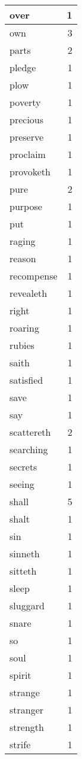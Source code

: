 \begin{center}
\begin{longtable}{l|r}
over & 1\\ \hline 
own & 3\\ \hline 
parts & 2\\ \hline 
pledge & 1\\ \hline 
plow & 1\\ \hline 
poverty & 1\\ \hline 
precious & 1\\ \hline 
preserve & 1\\ \hline 
proclaim & 1\\ \hline 
provoketh & 1\\ \hline 
pure & 2\\ \hline 
purpose & 1\\ \hline 
put & 1\\ \hline 
raging & 1\\ \hline 
reason & 1\\ \hline 
recompense & 1\\ \hline 
revealeth & 1\\ \hline 
right & 1\\ \hline 
roaring & 1\\ \hline 
rubies & 1\\ \hline 
saith & 1\\ \hline 
satisfied & 1\\ \hline 
save & 1\\ \hline 
say & 1\\ \hline 
scattereth & 2\\ \hline 
searching & 1\\ \hline 
secrets & 1\\ \hline 
seeing & 1\\ \hline 
shall & 5\\ \hline 
shalt & 1\\ \hline 
sin & 1\\ \hline 
sinneth & 1\\ \hline 
sitteth & 1\\ \hline 
sleep & 1\\ \hline 
sluggard & 1\\ \hline 
snare & 1\\ \hline 
so & 1\\ \hline 
soul & 1\\ \hline 
spirit & 1\\ \hline 
strange & 1\\ \hline 
stranger & 1\\ \hline 
strength & 1\\ \hline 
strife & 1\\ \hline 

\end{longtable}
\end{center}
